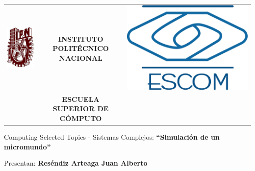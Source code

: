 \begin{titlepage}
    \begin{center}
        \begin{tabular}{r c l}
            \includegraphics[scale=.20]{images/ipn} & 
            \textbf{INSTITUTO POLITÉCNICO NACIONAL} & 
            \includegraphics[scale=.20]{images/escom}\\ & 
            \textbf{ESCUELA SUPERIOR DE C\'OMPUTO}
        \end{tabular}
    \end{center}

    \vspace{1.5cm}

    \begin{center}
        \large Computing Selected Topics - Sistemas Complejos: 
        \linebreak
        \large \textbf{``Simulación de un micromundo''} 
        \linebreak
    \end{center}

    \vspace{1.5cm}

    \begin{center}
        Presentan: 
        \linebreak
        \textbf{Reséndiz Arteaga Juan Alberto} 
        \linebreak
    \end{center}
     
\end{titlepage}
